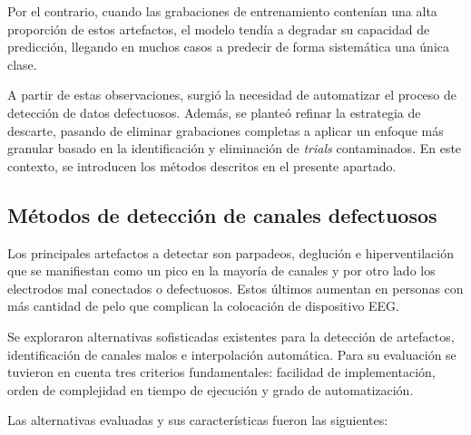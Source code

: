 Por el contrario, cuando las grabaciones de entrenamiento contenían una alta proporción de estos artefactos, el modelo tendía a degradar su capacidad de predicción, llegando en muchos casos a predecir de forma sistemática una única clase.

A partir de estas observaciones, surgió la necesidad de automatizar el proceso de detección de datos defectuosos. Además, se planteó refinar la estrategia de descarte, pasando de eliminar grabaciones completas a aplicar un enfoque más granular basado en la identificación y eliminación de \textit{trials} contaminados. En este contexto, se introducen los métodos descritos en el presente apartado.

\subsection{Métodos de detección de canales defectuosos}
\label{subsec:metodos_deteccion_canales}

Los principales artefactos a detectar son parpadeos, deglución e hiperventilación que se manifiestan como un pico en la mayoría de canales y por otro lado los electrodos mal conectados o defectuosos. Estos últimos aumentan en personas con más cantidad de pelo que complican la colocación de dispositivo EEG.

Se exploraron alternativas sofisticadas existentes para la detección de artefactos, identificación de canales malos e interpolación automática. Para su evaluación se tuvieron en cuenta tres criterios fundamentales: facilidad de implementación, orden de complejidad en tiempo de ejecución y grado de automatización.

Las alternativas evaluadas y sus características fueron las siguientes:

